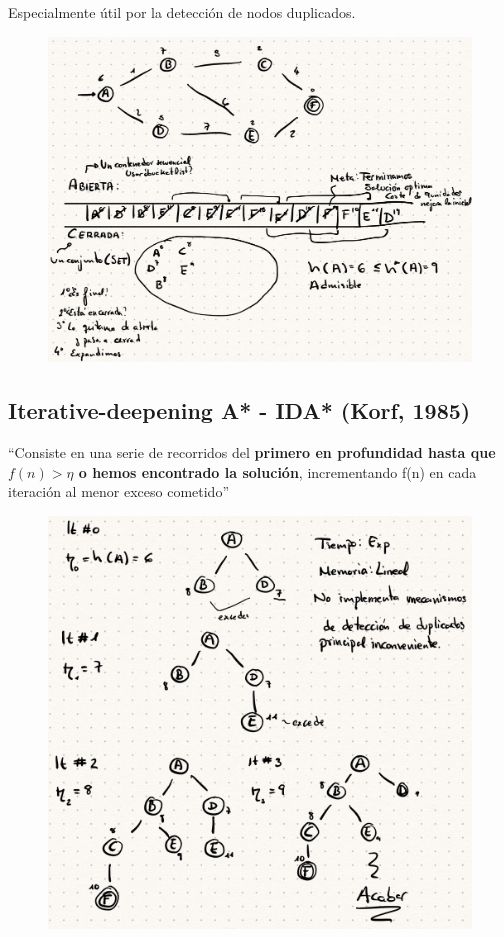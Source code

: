 \documentclass[12pt, twoside, openright]{report} %
\begin{document}
\begin{enumerate}
    Especialmente útil por la detección de nodos duplicados.
	\begin{figure}[H]
		{\includegraphics[scale=.32]{Untitled 56.png}}
	\end{figure}
  \end{enumerate}
\pagebreak
\subsection{Iterative-deepening A* - IDA* (Korf, 1985)}

  ``Consiste en una serie de recorridos del \textbf{primero en
  profundidad hasta que \(f(n) > \eta\) o hemos encontrado la solución},
  incrementando f(n) en cada iteración al menor exceso cometido''
  \begin{figure}[H]
	{\includegraphics[scale=.38]{Untitled 57.png}}
\end{figure}
\end{document}
